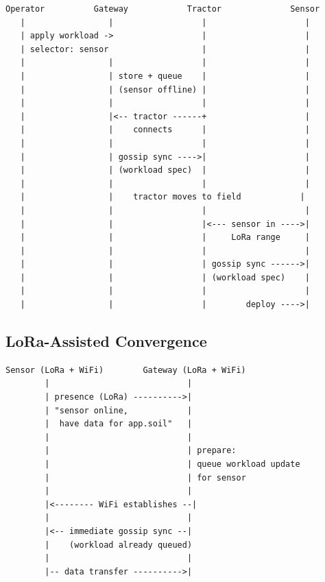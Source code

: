 \begin{Verbatim}[frame=single,fontsize=\small]
Operator          Gateway            Tractor              Sensor
   |                 |                  |                    |
   | apply workload ->                  |                    |
   | selector: sensor                   |                    |
   |                 |                  |                    |
   |                 | store + queue    |                    |
   |                 | (sensor offline) |                    |
   |                 |                  |                    |
   |                 |<-- tractor ------+                    |
   |                 |    connects      |                    |
   |                 |                  |                    |
   |                 | gossip sync ---->|                    |
   |                 | (workload spec)  |                    |
   |                 |                  |                    |
   |                 |    tractor moves to field            |
   |                 |                  |                    |
   |                 |                  |<--- sensor in ---->|
   |                 |                  |     LoRa range     |
   |                 |                  |                    |
   |                 |                  | gossip sync ------>|
   |                 |                  | (workload spec)    |
   |                 |                  |                    |
   |                 |                  |        deploy ---->|
\end{Verbatim}

\subsection{LoRa-Assisted Convergence}

\begin{Verbatim}[frame=single,fontsize=\small]
Sensor (LoRa + WiFi)        Gateway (LoRa + WiFi)
        |                            |
        | presence (LoRa) ---------->|
        | "sensor online,            |
        |  have data for app.soil"   |
        |                            |
        |                            | prepare: 
        |                            | queue workload update
        |                            | for sensor
        |                            |
        |<-------- WiFi establishes --|
        |                            |
        |<-- immediate gossip sync --|
        |    (workload already queued)
        |                            |
        |-- data transfer ---------->|
\end{Verbatim}

